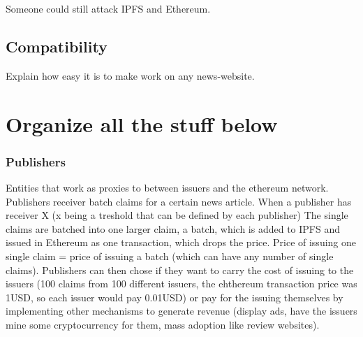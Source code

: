 Someone could still attack IPFS and Ethereum.

\subsection{Compatibility}
Explain how easy it is to make work on any news-website.

\section{Organize all the stuff below}
\subsubsection{Publishers}
Entities that work as proxies to between issuers and the ethereum network.
Publishers receiver batch claims for a certain news article. When a publisher has receiver X (x being a treshold that can be defined by each publisher)
The single claims are batched into one larger claim, a batch, which is added to IPFS and issued in Ethereum as one transaction, which drops the price. Price of issuing one single claim = price of issuing a batch (which can have any number of single claims).
Publishers can then chose if they want to carry the cost of issuing to the issuers (100 claims from 100 different issuers, the ehthereum transaction price was 1USD, so each issuer would pay 0.01USD) or pay for the issuing themselves by implementing other mechanisms to generate revenue (display ads, have the issuers mine some cryptocurrency for them, mass adoption like review websites).
